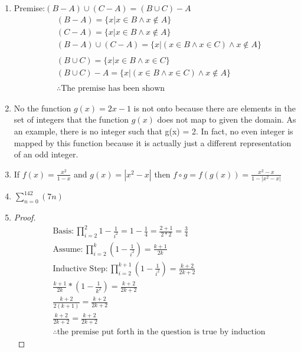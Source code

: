 \documentclass[11pt]{article}
\begin{document}
\begin{enumerate}
    \item Premise:$ (B - A) \cup (C - A) = (B\cup C) - A$
        \begin{align*}
            &(B - A) = \{x | x \in B \wedge x \notin A\} \\
            &(C - A) = \{x | x \in B \wedge x \notin A\} \\
            & (B - A) \cup (C - A) = \{x | (x \in B \wedge x \in C) \wedge x \notin A \} \\
            & \\
            & (B\cup C) = \{x | x \in B \wedge x \in C\} \\
            & (B\cup C) - A = \{x | (x \in B \wedge x \in C) \wedge x \notin A\} \\
            & \\
            & \therefore \text{The premise has been shown}
        \end{align*}

    \item No the function $g(x) = 2x - 1$ is not onto because there are elements
    in the set of integers that the function $g(x)$ does not map to given the
    domain. As an example, there is no integer such that g(x) = 2. In fact,
    no even integer is mapped by this function because it is actually just a different
    representation of an odd integer.

    \item If $ f(x) = \frac{x^2}{1-x} $ and $ g(x) = | x^2 - x | $ then $ f \circ g = f(g(x)) = \frac{x^2 - x}{1-|x^2 - x|}$

    \item $ \sum_{n=0}^{142}(7n) $
    
    \item 
        \begin{proof}
            \begin{align*}
                &\text{Basis}: \prod_{i=2}^{2}{1-\frac{1}{i^2}} = 1 - \frac{1}{4} = \frac{2+1}{2*2} = \frac{3}{4}\\
                &\text{Assume}: \prod_{i=2}^{k}(1-\frac{1}{i^2}) = \frac{k+1}{2k} \\
                &\text{Inductive Step}: \prod_{i=2}^{k+1}(1-\frac{1}{i^2}) = \frac{k+2}{2k+2} \\
                &\frac{k+1}{2k} * (1-\frac{1}{k^2}) = \frac{k+2}{2k+2} \\
                &\frac{k+2}{2(k+1)} = \frac{k+2}{2k+2} \\
                &\frac{k+2}{2k+2} = \frac{k+2}{2k+2} \\
                &\therefore \text{the premise put forth in the question is true by induction}        
            \end{align*}
        \end{proof}
    

\end{enumerate}
\end{document}
